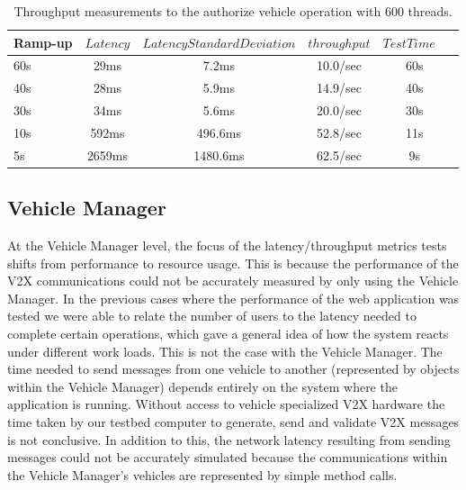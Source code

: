 	\begin{table}
		\renewcommand{\arraystretch}{1.2} %
		\centering
		\begin{tabular}{lccccc}
			\toprule
			Ramp-up           & $Latency$& $Latency Standard Deviation$ & $throughput$& $TestTime$ $$\\
			\midrule
			60s          & 29ms & 7.2ms & 10.0/sec & ~60s  \\
			40s          & 28ms & 5.9ms & 14.9/sec & ~40s  \\
			30s          & 34ms & 5.6ms & 20.0/sec & ~30s \\
			10s          & 592ms & 496.6ms & 52.8/sec & ~11s \\
			5s           & 2659ms & 1480.6ms & 62.5/sec & ~9s \\
			\bottomrule
			\end{tabular}
			
			\caption{Throughput measurements to the authorize vehicle operation with 600 threads.}
			\label{tab:table2}
		\end{table}
		
		
		
		\subsection{Vehicle Manager}
		\label{section:memory}
		At the Vehicle Manager level, the focus of the latency/throughput metrics tests shifts from performance to resource usage. This is because the performance of the V2X communications could not be accurately measured by only using the Vehicle Manager. In the previous cases where the performance of the web application was tested we were able to relate the number of users to the latency needed to complete certain operations, which gave a general idea of how the system reacts under different work loads. This is not the case with the Vehicle Manager. The time needed to send messages from one vehicle to another (represented by objects within the Vehicle Manager) depends entirely on the system where the application is running. Without access to vehicle specialized V2X hardware the time taken by our testbed computer to generate, send and validate V2X messages is not conclusive. In addition to this, the network latency resulting from sending messages could not be accurately simulated because the communications within the Vehicle Manager's vehicles are represented by simple method calls. 
		
